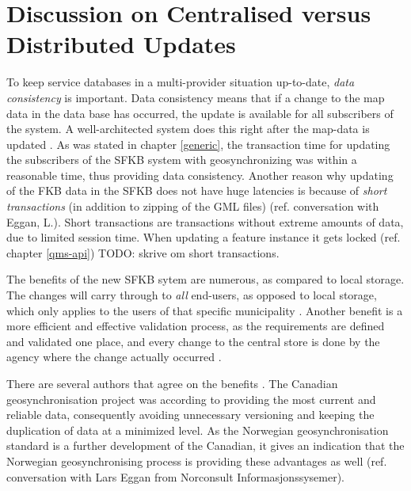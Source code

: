 \chapter{Discussion on Centralised versus Distributed Updates }
To keep service databases in a multi-provider situation up-to-date, \textit{data consistency} 
is important. Data consistency means that if a change to the map data in the data base has occurred, the update is available for all subscribers of the system. A well-architected system does this right after the map-data is updated \citep{Breslow2004}. As was stated in chapter \ref{generic}, the transaction time for updating the subscribers of the SFKB system with geosynchronizing was within a reasonable time, thus providing data consistency. Another reason why updating of the FKB data in the SFKB does not have huge latencies is because of \textit{short transactions} (in addition to zipping of the GML files) (ref. conversation with Eggan, L.). Short transactions are transactions without extreme amounts of data, due to limited session time. When updating a feature instance it gets locked (ref. chapter \ref{qms-api})  TODO: skrive om short transactions.


The benefits of the new SFKB sytem are numerous, as compared to local storage. 
The changes will carry through to \textit{all} end-users, as opposed to local storage, which only applies to the users of that specific municipality \citep{Dontigney2017}. Another benefit is a more efficient and effective validation process, as the requirements are defined and validated one place, and every change to the central store is done by the agency where the change actually occurred \citep{Kartverket2017e}. 

There are several authors that agree on the benefits \citep{Reichardt2012, Zhao2012}. The Canadian geosynchronisation project was according to \cite{Reichardt2012} providing the most current and reliable data, consequently avoiding unnecessary versioning and keeping the duplication of data at a minimized level. As the Norwegian geosynchronisation standard is a further development of the Canadian, it gives an indication that the Norwegian geosynchronising process is providing these advantages as well (ref. conversation with Lars Eggan from Norconsult Informasjonssysemer).



